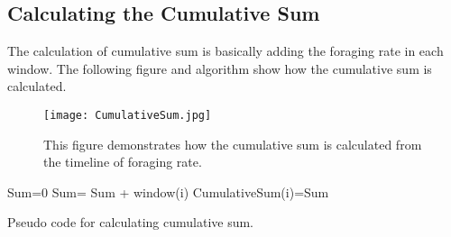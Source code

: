  \subsection{\label{Calculating the Cumulative Sum}Calculating the Cumulative Sum}
 The calculation of cumulative sum is basically adding the foraging rate in each window. The following figure and algorithm show how the cumulative sum is calculated.
 \begin{figure}[h]
 	\texttt{[image: CumulativeSum.jpg]}
 	\caption{This figure demonstrates how the cumulative sum is calculated from the timeline of foraging rate.}
 \end{figure}

 \begin{algorithm}[H]
 	\begin{algorithmic}[1]
 		\State Sum=0
 			\State Sum= Sum + window(i)
 			\State CumulativeSum(i)=Sum
 		\EndFor
 		\caption{Pseudo code for calculating cumulative sum.}
 		\label{Pseudo code for calculating cumulative sum.}
 	\end{algorithmic}
 \end{algorithm}
 
